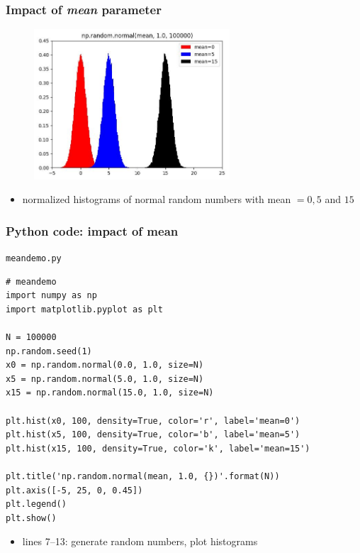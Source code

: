 \documentclass[english,14pt]{beamer}
\begin{document}

\begin{frame}[fragile]

\frametitle{Impact of \emph{mean} parameter}

\begin{figure}[ht]
	\centering
	\includegraphics[width=0.65\textwidth]{figures/meanDemoOutput}
\end{figure}

\vspace*{-5mm}

\begin{itemize}
	\item normalized histograms of normal random numbers with mean $=0, 5$ and $15$
\end{itemize}

\end{frame}


\begin{frame}[fragile]

\frametitle{Python code: impact of mean}

\vspace*{-3mm}

\texttt{meandemo.py}
\vspace*{-1mm}
\begin{lstlisting}[style=CStyle,basicstyle=\scriptsize]
# meandemo
import numpy as np
import matplotlib.pyplot as plt

N = 100000
np.random.seed(1)
x0 = np.random.normal(0.0, 1.0, size=N)
x5 = np.random.normal(5.0, 1.0, size=N)
x15 = np.random.normal(15.0, 1.0, size=N)

plt.hist(x0, 100, density=True, color='r', label='mean=0')
plt.hist(x5, 100, density=True, color='b', label='mean=5')
plt.hist(x15, 100, density=True, color='k', label='mean=15')

plt.title('np.random.normal(mean, 1.0, {})'.format(N))
plt.axis([-5, 25, 0, 0.45])
plt.legend()
plt.show()
\end{lstlisting}

\vspace*{-2mm}

\begin{itemize}
	\item lines 7--13: generate random numbers, plot histograms
\end{itemize}

\end{frame}
\end{document}
